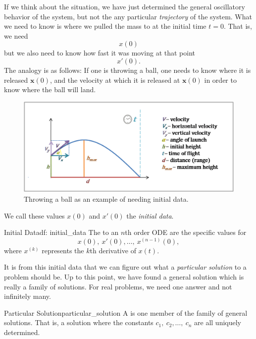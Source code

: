         If we think about the situation, we have just determined the general oscillatory behavior of the system, but not the any particular \emph{trajectory} of the system. What we need to know is where we pulled the mass to at the initial time $t=0$. That is, we need
        \[
        x(0)
        \]
        but we also need to know how fast it was moving at that point 
        \[
        x'(0).
        \]
        The analogy is as follows: If one is throwing a ball, one needs to know where it is released $\mathbf{x}(0)$, and the velocity at which it is released at $\mathbf{x}(0)$ in order to know where the ball will land.
        \begin{figure}[H]
            \centering
            \includegraphics[width=.7\textwidth]{Figures/projectile-motion.png}
            \caption{Throwing a ball as an example of needing initial data.}
            \label{fig:proj_motion}
        \end{figure}
        \noindent We call these values $x(0)$ and $x'(0)$ the \emph{initial data}. 
        
        \begin{df}{Initial Data}{df: initial_data}
            The   to an $n$th order ODE are the specific values for
            \[
            x(0),~ x'(0),\dots,~ x^{(n-1)}(0),
            \]
            where $x^{(k)}$ represents the $k$th derivative of $x(t)$.
        \end{df}
        
        \noindent It is from this initial data that we can figure out what a \emph{particular solution} to a problem should be.  Up to this point, we have found a general solution which is really a family of solutions. For real problems, we need one answer and not infinitely many.  
        
        \begin{df}{Particular Solution}{particular_solution}
            A  is one member of the family of general solutions.  That is, a solution where the constants $c_1,~c_2,\dots,~c_n$ are all uniquely determined.
        \end{df}
        

